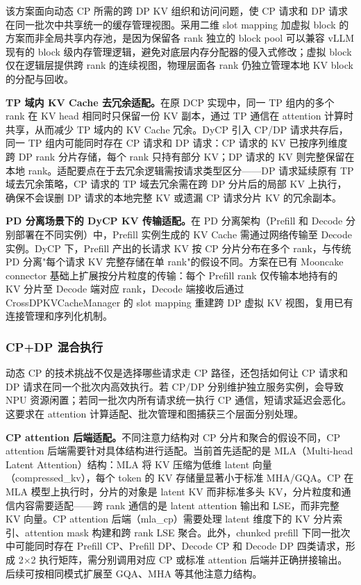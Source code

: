 该方案面向动态 CP 所需的跨 DP KV 组织和访问问题，使 CP 请求和 DP 请求在同一批次中共享统一的缓存管理视图。采用二维 slot mapping 加虚拟 block 的方案而非全局共享内存池，是因为保留各 rank 独立的 block pool 可以兼容 vLLM 现有的 block 级内存管理逻辑，避免对底层内存分配器的侵入式修改；虚拟 block 仅在逻辑层提供跨 rank 的连续视图，物理层面各 rank 仍独立管理本地 KV block 的分配与回收。

\textbf{TP 域内 KV Cache 去冗余适配。}在原 DCP 实现中，同一 TP 组内的多个 rank 在 KV head 相同时只保留一份 KV 副本，通过 TP 通信在 attention 计算时共享，从而减少 TP 域内的 KV Cache 冗余。DyCP 引入 CP/DP 请求共存后，同一 TP 组内可能同时存在 CP 请求和 DP 请求：CP 请求的 KV 已按序列维度跨 DP rank 分片存储，每个 rank 只持有部分 KV；DP 请求的 KV 则完整保留在本地 rank。适配要点在于去冗余逻辑需按请求类型区分——DP 请求延续原有 TP 域去冗余策略，CP 请求的 TP 域去冗余需在跨 DP 分片后的局部 KV 上执行，确保不会误删 DP 请求的本地完整 KV 或遗漏 CP 请求分片 KV 的冗余副本。

\textbf{PD 分离场景下的 DyCP KV 传输适配。}在 PD 分离架构（Prefill 和 Decode 分别部署在不同实例）中，Prefill 实例生成的 KV Cache 需通过网络传输至 Decode 实例。DyCP 下，Prefill 产出的长请求 KV 按 CP 分片分布在多个 rank，与传统 PD 分离"每个请求 KV 完整存储在单 rank"的假设不同。方案在已有 Mooncake connector 基础上扩展按分片粒度的传输：每个 Prefill rank 仅传输本地持有的 KV 分片至 Decode 端对应 rank，Decode 端接收后通过 CrossDPKVCacheManager 的 slot mapping 重建跨 DP 虚拟 KV 视图，复用已有连接管理和序列化机制。

\FloatBarrier

\subsubsection{CP+DP 混合执行}

动态 CP 的技术挑战不仅是选择哪些请求走 CP 路径，还包括如何让 CP 请求和 DP 请求在同一个批次内高效执行。若 CP/DP 分别维护独立服务实例，会导致 NPU 资源闲置；若同一批次内所有请求统一执行 CP 通信，短请求延迟会恶化。这要求在 attention 计算适配、批次管理和图捕获三个层面分别处理。

\textbf{CP attention 后端适配。}不同注意力结构对 CP 分片和聚合的假设不同，CP attention 后端需要针对具体结构进行适配。当前首先适配的是 MLA（Multi-head Latent Attention）结构：MLA 将 KV 压缩为低维 latent 向量（compressed\_kv），每个 token 的 KV 存储量显著小于标准 MHA/GQA。CP 在 MLA 模型上执行时，分片的对象是 latent KV 而非标准多头 KV，分片粒度和通信内容需要适配——跨 rank 通信的是 latent attention 输出和 LSE，而非完整 KV 向量。CP attention 后端（mla\_cp）需要处理 latent 维度下的 KV 分片索引、attention mask 构建和跨 rank LSE 聚合。此外，chunked prefill 下同一批次中可能同时存在 Prefill CP、Prefill DP、Decode CP 和 Decode DP 四类请求，形成 2$\times$2 执行矩阵，需分别调用对应 CP 或标准 attention 后端并正确拼接输出。后续可按相同模式扩展至 GQA、MHA 等其他注意力结构。

